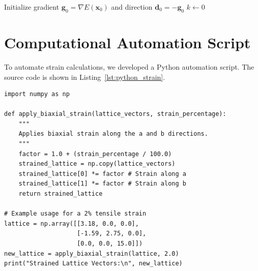 \begin{algorithm}[H]
\DontPrintSemicolon
{}
Initialize gradient $\mathbf{g}_0 = \nabla E(\mathbf{x}_0)$ and direction $\mathbf{d}_0 = -\mathbf{g}_0$\;
$k \leftarrow 0$\;
\caption{Conjugate Gradient minimization for structural relaxation.}
\label{alg:cg}
\end{algorithm}

\section{Computational Automation Script}
To automate strain calculations, we developed a Python automation script. The source code is shown in Listing~\ref{lst:python_strain}.

\begin{lstlisting}[style=pythonstyle, caption={Python script to apply biaxial strain to a unit cell file.}, label={lst:python_strain}]
import numpy as np

def apply_biaxial_strain(lattice_vectors, strain_percentage):
    """
    Applies biaxial strain along the a and b directions.
    """
    factor = 1.0 + (strain_percentage / 100.0)
    strained_lattice = np.copy(lattice_vectors)
    strained_lattice[0] *= factor # Strain along a
    strained_lattice[1] *= factor # Strain along b
    return strained_lattice

# Example usage for a 2% tensile strain
lattice = np.array([[3.18, 0.0, 0.0],
                    [-1.59, 2.75, 0.0],
                    [0.0, 0.0, 15.0]])
new_lattice = apply_biaxial_strain(lattice, 2.0)
print("Strained Lattice Vectors:\n", new_lattice)
\end{lstlisting}
